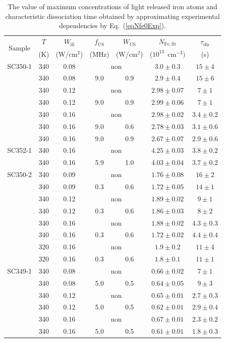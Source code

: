 \documentclass[%
 aip,jap,
 amsmath,amssymb,
 reprint,%
]{revtex4-1}
\begin{document}
\begin{table}
\caption{\label{tabSample}The value of maximum concentrations of light released iron atoms
and characteristic dissociation time obtained by approximating experimental dependencies by Eq.~(\ref{eqNfe0Exp}).
}
\begin{ruledtabular}
\begin{tabular}{ccccccc}
\multirow{2}{*}{Sample} &$T$&$W_\mathrm{ill}$&$f_\mathrm{US}$&$W_\mathrm{US}$& $N_\mathrm{Fe,fit}$
&$\tau_\mathrm{dis}$ \\
&(K)& (W/cm$^2$)& (MHz)&(W/cm$^2$)&($10^{13}$~cm$^{-3})$&(s) \\
\hline
SC350-1&340&0.08&\multicolumn{2}{c}{non}&$3.0\pm0.3$&$15\pm4$\\
&340&0.08&9.0&0.9&$2.9\pm0.4$&$15\pm6$\\
&340&0.12&\multicolumn{2}{c}{non}&$2.98\pm0.07$&$7\pm1$\\
&340&0.12&9.0&0.9&$2.99\pm0.06$&$7\pm1$\\
&340&0.16&\multicolumn{2}{c}{non}&$2.98\pm0.02$&$3.4\pm0.2$\\
&340&0.16&9.0&0.6&$2.78\pm0.03$&$3.1\pm0.6$\\
&340&0.16&9.0&0.9&$2.67\pm0.07$&$2.9\pm0.6$\\
SC352-1&340&0.16&\multicolumn{2}{c}{non}&$4.25\pm0.03$&$3.8\pm0.2$\\
&340&0.16&5.9&1.0&$4.03\pm0.04$&$3.7\pm0.2$\\
SC350-2&340&0.09&\multicolumn{2}{c}{non}&$1.76\pm0.08$&$16\pm2$\\
&340&0.09&0.3&0.6&$1.72\pm0.05$&$14\pm1$\\
&340&0.12&\multicolumn{2}{c}{non}&$1.89\pm0.02$&$9\pm1$\\
&340&0.12&0.3&0.6&$1.86\pm0.03$&$8\pm2$\\
&340&0.16&\multicolumn{2}{c}{non}&$1.88\pm0.02$&$4.3\pm0.3$\\
&340&0.16&0.3&0.6&$1.72\pm0.02$&$4.4\pm0.4$\\
&320&0.16&\multicolumn{2}{c}{non}&$1.9\pm0.2$&$11\pm4$\\
&320&0.16&0.3&0.6&$1.8\pm0.1$&$11\pm1$\\
SC349-1&340&0.08&\multicolumn{2}{c}{non}&$0.66\pm0.02$&$7\pm1$\\
&340&0.08&5.0&0.5&$0.64\pm0.05$&$9\pm3$\\
&340&0.12&\multicolumn{2}{c}{non}&$0.65\pm0.01$&$2.7\pm0.3$\\
&340&0.12&5.0&0.5&$0.62\pm0.01$&$2.9\pm0.4$\\
&340&0.16&\multicolumn{2}{c}{non}&$0.67\pm0.01$&$2.3\pm0.2$\\
&340&0.16&5.0&0.5&$0.61\pm0.01$&$1.8\pm0.3$\\
\end{tabular}
\end{ruledtabular}
\end{table}
\end{document}
